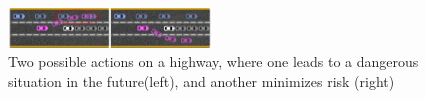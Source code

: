 \documentclass[letterpaper, 10 pt, conference]{ieeeconf}  %
\newcommand\NB[1]{$\spadesuit$\footnote{NB: #1}}
\begin{document}
\begin{figure}[h]
    \includegraphics[width=0.48\textwidth]{fig/highway.png}
    \caption{Two possible actions on a highway, where one leads to a dangerous situation in the future(left), and another minimizes risk (right)}
    \label{fig:hiway}
\end{figure}
    
\end{document}
